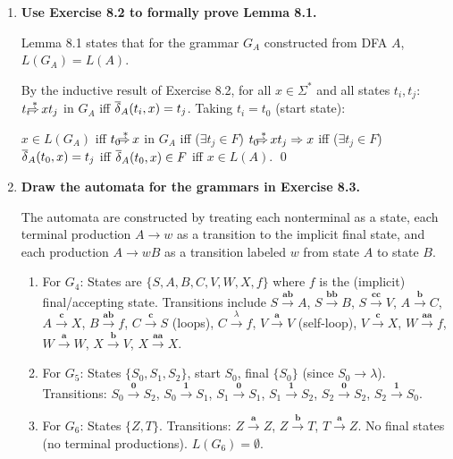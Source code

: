 \begin{enumerate}[{8.}1. ]
\item \textbf{Use Exercise 8.2 to formally prove Lemma 8.1.}

Lemma 8.1 states that for the grammar $G_A$ constructed from DFA $A$, $L(G_A) = L(A)$.

By the inductive result of Exercise 8.2, for all $x \in \Sigma^*$ and all states $t_i, t_j$: $t_i \DRightarrow x t_j$ in $G_A$ iff $\overline{\delta}_A(t_i, x) = t_j$. Taking $t_i = t_0$ (start state):

$x \in L(G_A)$ iff $t_0 \DRightarrow x$ in $G_A$ iff ($\exists t_j \in F$) $t_0 \DRightarrow x t_j \Rightarrow x$ iff ($\exists t_j \in F$) $\overline{\delta}_A(t_0, x) = t_j$ iff $\overline{\delta}_A(t_0, x) \in F$ iff $x \in L(A)$. \qed

\item \textbf{Draw the automata for the grammars in Exercise 8.3.}

The automata are constructed by treating each nonterminal as a state, each terminal production $A \to w$ as a transition to the implicit final state, and each production $A \to wB$ as a transition labeled $w$ from state $A$ to state $B$.

\begin{enumerate}
\item For $G_4$: States are $\{S, A, B, C, V, W, X, f\}$ where $f$ is the (implicit) final/accepting state. Transitions include $S \xrightarrow{\pmb{ab}} A$, $S \xrightarrow{\pmb{bb}} B$, $S \xrightarrow{\pmb{cc}} V$, $A \xrightarrow{\pmb{b}} C$, $A \xrightarrow{\pmb{c}} X$, $B \xrightarrow{\pmb{ab}} f$, $C \xrightarrow{\pmb{c}} S$ (loops), $C \xrightarrow{\lambda} f$, $V \xrightarrow{\pmb{a}} V$ (self-loop), $V \xrightarrow{\pmb{c}} X$, $W \xrightarrow{\pmb{aa}} f$, $W \xrightarrow{\pmb{a}} W$, $X \xrightarrow{\pmb{b}} V$, $X \xrightarrow{\pmb{aa}} X$.

\item For $G_5$: States $\{S_0, S_1, S_2\}$, start $S_0$, final $\{S_0\}$ (since $S_0 \to \lambda$). Transitions: $S_0 \xrightarrow{\pmb{0}} S_2$, $S_0 \xrightarrow{\pmb{1}} S_1$, $S_1 \xrightarrow{\pmb{0}} S_1$, $S_1 \xrightarrow{\pmb{1}} S_2$, $S_2 \xrightarrow{\pmb{0}} S_2$, $S_2 \xrightarrow{\pmb{1}} S_0$.

\item For $G_6$: States $\{Z, T\}$. Transitions: $Z \xrightarrow{\pmb{a}} Z$, $Z \xrightarrow{\pmb{b}} T$, $T \xrightarrow{\pmb{a}} Z$. No final states (no terminal productions). $L(G_6) = \emptyset$.


\end{enumerate}
\end{enumerate}
